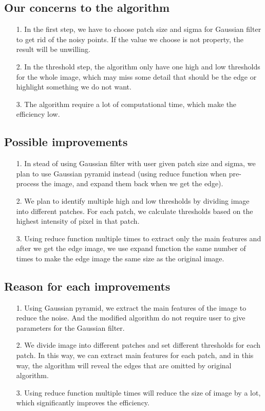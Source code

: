\documentclass[10pt,twocolumn,letterpaper]{article}
\begin{document}
\subsection{Our concerns to the algorithm}
\begin{enumerate}
	\item[1.] In the first step, we have to choose patch size and sigma for Gaussian filter to get rid of the noisy points. If the value we choose is not property, the result will be unwilling.
	\item[2.] In the threshold step, the algorithm only have one high and low thresholds for the whole image, which may miss some detail that should be the edge or highlight something we do not want.
	\item[3.] The algorithm require a lot of computational time, which make the efficiency low.
\end{enumerate}

\subsection{Possible improvements}
\begin{enumerate}
	\item[1.] In stead of using Gaussian filter with user given patch size and sigma, we plan to use Gaussian pyramid instead (using reduce function when pre-process the image, and expand them back when we get the edge).
	\item[2.] We plan to identify multiple high and low thresholds by dividing image into different patches. For each patch, we calculate thresholds based on the highest intensity of pixel in that patch.
	\item[3.] Using reduce function multiple times to extract only the main features and after we get the edge image, we use expand function the same number of times to make the edge image the same size as the original image.
\end{enumerate}

\subsection{Reason for each improvements}
\begin{enumerate}
	\item[1.] Using Gaussian pyramid, we extract the main features of the image to reduce the noise. And the modified algorithm do not require user to give parameters for the Gaussian filter.
	\item[2.] We divide image into different patches and set different thresholds for each patch. In this way, we can extract main features for each patch, and in this way, the algorithm will reveal the edges that are omitted by original algorithm. 
	\item[3.] Using reduce function multiple times will reduce the size of image by a lot, which significantly improves the efficiency.
\end{enumerate}
\end{document}
